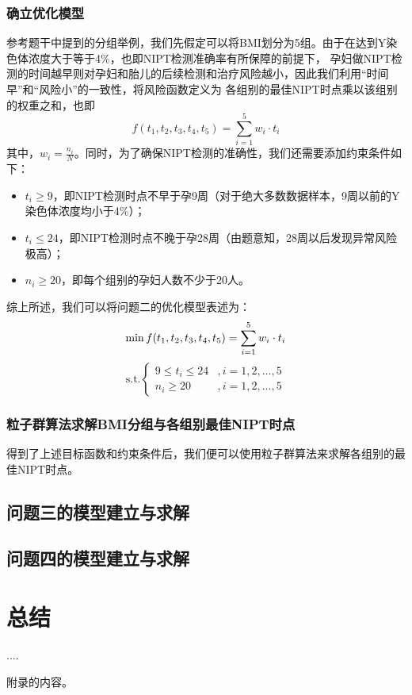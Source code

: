 \documentclass{cumcmthesis}
\begin{document}
            \subsubsection{确立优化模型}
            参考题干中提到的分组举例，我们先假定可以将BMI划分为5组。由于在达到Y染色体浓度大于等于4\%，也即NIPT检测准确率有所保障的前提下，
            孕妇做NIPT检测的时间越早则对孕妇和胎儿的后续检测和治疗风险越小，因此我们利用“时间早”和“风险小”的一致性，将风险函数定义为
            各组别的最佳NIPT时点乘以该组别的权重之和，也即
            \begin{equation}
                f(t_1,t_2,t_3,t_4,t_5)=\sum_{i=1}^5 w_i \cdot t_i
            \end{equation}
            其中，$w_i=\displaystyle\frac{n_i}{N}$。同时，为了确保NIPT检测的准确性，我们还需要添加约束条件如下：
            \begin{itemize}
                \item $t_i \geq 9$，即NIPT检测时点不早于孕9周（对于绝大多数数据样本，9周以前的Y染色体浓度均小于4\%）；
                \item $t_i \leq 24$，即NIPT检测时点不晚于孕28周（由题意知，28周以后发现异常风险极高）；
                \item $n_i \geq 20$，即每个组别的孕妇人数不少于20人。
            \end{itemize}
            \par
            综上所述，我们可以将问题二的优化模型表述为：
           \begin{equation}
            \min f(t_1,t_2,t_3,t_4,t_5)=\sum_{i=1}^5 w_i \cdot t_i
            \\ 
           \end{equation}
           \[\text{s.t.}\begin{cases}9\leq t_i\leq 24 & ,i=1,2,\dots,5\\n_i\geq 20&,i=1,2,\dots,5\end{cases}\]
           \par
            \subsubsection{粒子群算法求解BMI分组与各组别最佳NIPT时点}
            得到了上述目标函数和约束条件后，我们便可以使用粒子群算法来求解各组别的最佳NIPT时点。
        \subsection{问题三的模型建立与求解}
        \subsection{问题四的模型建立与求解}
        \section{总结}
        \begin{thebibliography}{9}%
             ....
        \end{thebibliography}
        \begin{appendices}
            附录的内容。
        \end{appendices}
\end{document}
